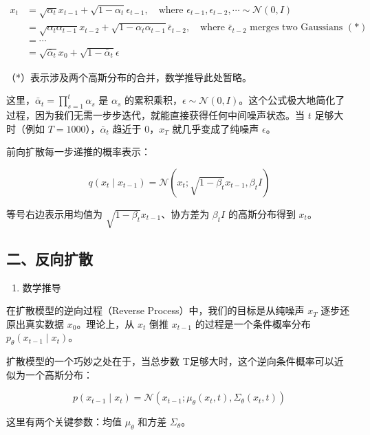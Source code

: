 \[
\begin{aligned}
x_t
&= \sqrt{\alpha_t}x_{t-1} + \sqrt{1-\alpha_t}\epsilon_{t-1},
\quad \text{where } \epsilon_{t-1},\epsilon_{t-2},\cdots \sim \mathcal{N}(0,I) \\
&= \sqrt{\alpha_t\alpha_{t-1}}x_{t-2}
 + \sqrt{1-\alpha_t\alpha_{t-1}}\bar{\epsilon}_{t-2},
\quad \text{where } \bar{\epsilon}_{t-2} \text{ merges two Gaussians } (*) \\
&= \cdots \\
&= \sqrt{\bar{\alpha}_t}x_0+\sqrt{1-\bar{\alpha}_t}\epsilon
\end{aligned}
\]

（*）表示涉及两个高斯分布的合并，数学推导此处暂略。

这里，\(\bar{\alpha}_t=\prod_{s=1}^{t}\alpha_s\) 是 \(\alpha_s\) 的累积乘积，\(\epsilon\sim\mathcal{N}(0,I)\)。这个公式极大地简化了过程，因为我们无需一步步迭代，就能直接获得任何中间噪声状态。当 \(t\) 足够大时（例如 \(T=1000\)），\(\bar{\alpha}_t\) 趋近于 \(0\)，\(x_T\) 就几乎变成了纯噪声 \(\epsilon\)。

前向扩散每一步递推的概率表示：

\[
q(x_t\mid x_{t-1}) = \mathcal{N}(x_t;\sqrt{1-\beta_t}x_{t-1},\beta_t I)
\]

等号右边表示用均值为 \(\sqrt{1-\beta_t}x_{t-1}\)、协方差为 \(\beta_t I\) 的高斯分布得到 \(x_t\)。

\hypertarget{ux4e8cux53cdux5411ux6269ux6563}{%
\subsection{二、反向扩散}\label{ux4e8cux53cdux5411ux6269ux6563}}

\begin{enumerate}
\def\labelenumi{\arabic{enumi}.}
\tightlist
\item
  数学推导
\end{enumerate}

在扩散模型的逆向过程（Reverse Process）中，我们的目标是从纯噪声 \(x_T\) 逐步还原出真实数据 \(x_0\)。理论上，从 \(x_t\) 倒推 \(x_{t-1}\) 的过程是一个条件概率分布 \(p_\theta(x_{t-1}\mid x_t)\)。

扩散模型的一个巧妙之处在于，当总步数 T足够大时，这个逆向条件概率可以近似为一个高斯分布：

\[
p(x_{t-1}\mid x_t)=\mathcal{N}(x_{t-1};\mu_\theta(x_t,t),\Sigma_\theta(x_t,t))
\]

这里有两个关键参数：均值 \(\mu_\theta\) 和方差 \(\Sigma_\theta\)。

